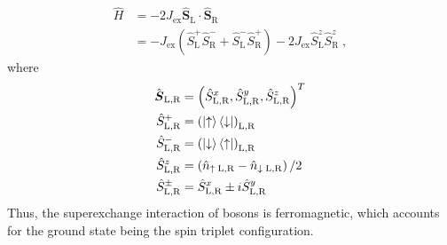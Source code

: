\begin{align}
	\hat{H} &= -2 J_{\mathrm{ex}} \hat{\boldsymbol{S}}_{\mathrm{L}} \cdot \hat{\boldsymbol{S}}_{\mathrm{R}} \nonumber \\
	&= - J_{\mathrm{ex}} \left( \hat{S}_{\mathrm{L}}^{+} \hat{S}_{\mathrm{R}}^{-} + \hat{S}_{\mathrm{L}}^{-} \hat{S}_{\mathrm{R}}^{+} \right) - 2 J_{\mathrm{ex}} \hat{S}_{\mathrm{L}}^{z} \hat{S}_{\mathrm{R}}^{z} \; , \label{eq:twositeFerro}
\end{align}
where 
\begin{align*}
\hat{\boldsymbol{S}}_{\mathrm{L,R}} &= \left(  \hat{S}_{\mathrm{L,R}}^{x} , \hat{S}_{\mathrm{L,R}}^{y} , \hat{S}_{\mathrm{L,R}}^{z} \right)^{T} \\
\hat{S}_{\mathrm{L},\mathrm{R}}^{+} &= \left( \ket{\uparrow}\bra{\downarrow} \right)_{\mathrm{L},\mathrm{R}} \\
\hat{S}_{\mathrm{L},\mathrm{R}}^{-} &= \left( \ket{\downarrow}\bra{\uparrow} \right)_{\mathrm{L},\mathrm{R}} \\
\hat{S}_{\mathrm{L},\mathrm{R}}^{z} &= \left( \hat{n}_{\uparrow \; \mathrm{L},\mathrm{R}} - \hat{n}_{\downarrow \; \mathrm{L},\mathrm{R}} \right)/2 \\
\hat{S}_{\mathrm{L},\mathrm{R}}^{\pm} &= \hat{S}_{\mathrm{L},\mathrm{R}}^{x} \pm i \hat{S}_{\mathrm{L},\mathrm{R}}^{y}
\end{align*}
Thus, the superexchange interaction of bosons is ferromagnetic, which accounts for the ground state being the spin triplet configuration.

